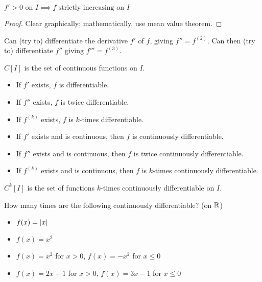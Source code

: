 \begin{property}
	$f' > 0 \text{ on } I \implies f \text{ strictly increasing on } I$
\end{property}
\begin{proof}
	Clear graphically; mathematically, use mean value theorem.
\end{proof}

Can (try to) differentiate the derivative $f'$ of $f$, giving $f'' = f^{(2)}$.
Can then (try to) differentiate $f''$ giving $f''' = f^{(3)}$.
\begin{definition}
	$C \left[ I \right]$ is the set of continuous functions on $I$.
	\begin{itemize}
		\item If $f'$ exists, $f$ is differentiable.
		\item If $f''$ exists, $f$ is twice differentiable.	
		\item If $f^{(k)}$ exists, $f$ is $k$-times differentiable.
	\end{itemize}
	\begin{itemize}
		\item If $f'$ exists and is continuous, then $f$ is continuously differentiable.
		\item If $f''$ exists and is continuous, then $f$ is twice continuously differentiable.
		\item If $f^{(k)}$ exists and is continuous, then $f$ is $k$-times continuously differentiable.
	\end{itemize}
	$C^k \left[ I \right]$ is the set of functions $k$-times continuously differentiable on $I$.
\end{definition}

\begin{question}
	How many times are the following continuously differentiable? (on $\mathbb{R}$)
	\begin{itemize}
		\item $f(x) = | x |$
		\item $f(x) = x^2$
		\item $f(x) = x^2$ for $x>0$, $f(x) = -x^2$ for $x \leq 0$
		\item $f(x) = 2x+1$ for $x>0$, $f(x) = 3x-1$ for $x \leq 0$
	\end{itemize}
\end{question}